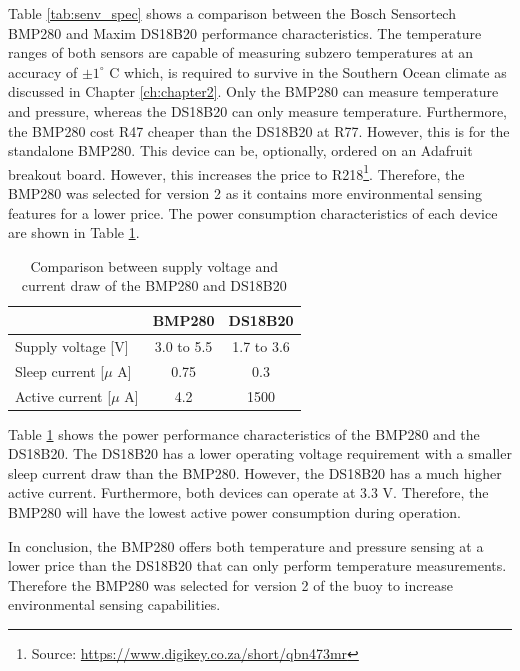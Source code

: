 Table \ref{tab:senv_spec} shows a comparison between the Bosch Sensortech BMP280 and Maxim DS18B20 performance characteristics. The temperature ranges of both sensors are capable of measuring subzero temperatures at an accuracy of $\pm1^\circ$ C which, is required to survive in the Southern Ocean climate as discussed in Chapter \ref{ch:chapter2}. Only the BMP280 can measure temperature and pressure, whereas the DS18B20 can only measure temperature. Furthermore, the BMP280 cost R47 cheaper than the DS18B20 at R77. However, this is for the standalone BMP280. This device can be, optionally,  ordered on an Adafruit breakout board. However, this increases the price to R218\footnote{Source: \url{https://www.digikey.co.za/short/qbn473mr}}. Therefore, the BMP280 was selected for version 2 as it contains more environmental sensing features for a lower price. The power consumption characteristics of each device are shown in Table \ref{tab:env_power}.

\begin{table}[H]
	\centering
	\caption{Comparison between supply voltage and current draw of the BMP280 and DS18B20}
	\setlength{\extrarowheight}{5pt}
	\begin{tabular}{lcc}
		\hline
		&  \textbf{BMP280} & \textbf{DS18B20}\\
		\hline
		\hline
		Supply voltage [V] & 3.0 to 5.5 & 1.7 to 3.6\\
		\hline
		Sleep current [$\mu$ A]& 0.75 & 0.3\\ 
		\hline
		Active current [$\mu$ A] & 4.2 &1500 \\
		\hline
		\hline

	\end{tabular}
	\label{tab:env_power}
\end{table}

Table \ref{tab:env_power} shows the power performance characteristics of the BMP280 and the DS18B20. The DS18B20 has a lower operating voltage requirement with a smaller sleep current draw than the BMP280. However, the DS18B20 has a much higher active current. Furthermore, both devices can operate at 3.3 V. Therefore, the BMP280 will have the lowest active power consumption during operation. \par 

In conclusion, the BMP280 offers both temperature and pressure sensing at a lower price than the DS18B20 that can only perform temperature measurements. Therefore the BMP280 was selected for version 2 of the buoy to increase environmental sensing capabilities.

